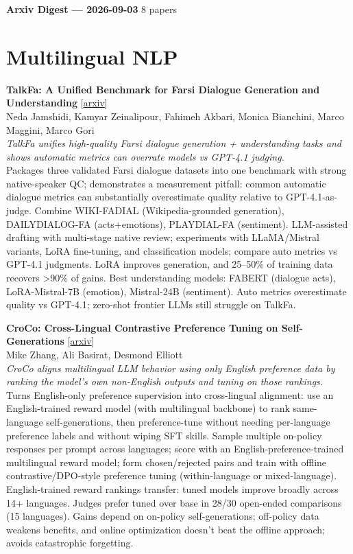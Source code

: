 \documentclass[12pt,letterpaper]{article}
\begin{document}
{\footnotesize\textbf{Arxiv Digest --- 2026-09-03} \hfill 8 papers}

\smallskip

\section*{Multilingual NLP}

{\small\textbf{TalkFa: A Unified Benchmark for Farsi Dialogue Generation and Understanding}} {\scriptsize[\href{https://arxiv.org/abs/2609.01810}{arxiv}]}\\
{\scriptsize Neda Jamshidi, Kamyar Zeinalipour, Fahimeh Akbari, Monica Bianchini, Marco Maggini, Marco Gori}\\

{\small\textit{TalkFa unifies high-quality Farsi dialogue generation + understanding tasks and shows automatic metrics can overrate models vs GPT-4.1 judging.}}\\[1pt]
{\footnotesize Packages three validated Farsi dialogue datasets into one benchmark with strong native-speaker QC; demonstrates a measurement pitfall: common automatic dialogue metrics can substantially overestimate quality relative to GPT-4.1-as-judge. Combine WIKI-FADIAL (Wikipedia-grounded generation), DAILYDIALOG-FA (acts+emotions), PLAYDIAL-FA (sentiment). LLM-assisted drafting with multi-stage native review; experiments with LLaMA/Mistral variants, LoRA fine-tuning, and classification models; compare auto metrics vs GPT-4.1 judgments. LoRA improves generation, and 25--50\% of training data recovers >90\% of gains. Best understanding models: FABERT (dialogue acts), LoRA-Mistral-7B (emotion), Mistral-24B (sentiment). Auto metrics overestimate quality vs GPT-4.1; zero-shot frontier LLMs still struggle on TalkFa.}

\medskip

{\small\textbf{CroCo: Cross-Lingual Contrastive Preference Tuning on Self-Generations}} {\scriptsize[\href{https://arxiv.org/abs/2605.26293}{arxiv}]}\\
{\scriptsize Mike Zhang, Ali Basirat, Desmond Elliott}\\

{\small\textit{CroCo aligns multilingual LLM behavior using only English preference data by ranking the model's own non-English outputs and tuning on those rankings.}}\\[1pt]
{\footnotesize Turns English-only preference supervision into cross-lingual alignment: use an English-trained reward model (with multilingual backbone) to rank same-language self-generations, then preference-tune without needing per-language preference labels and without wiping SFT skills. Sample multiple on-policy responses per prompt across languages; score with an English-preference-trained multilingual reward model; form chosen/rejected pairs and train with offline contrastive/DPO-style preference tuning (within-language or mixed-language). English-trained reward rankings transfer: tuned models improve broadly across 14+ languages. Judges prefer tuned over base in 28/30 open-ended comparisons (15 languages). Gains depend on on-policy self-generations; off-policy data weakens benefits, and online optimization doesn't beat the offline approach; avoids catastrophic forgetting.}
\end{document}
